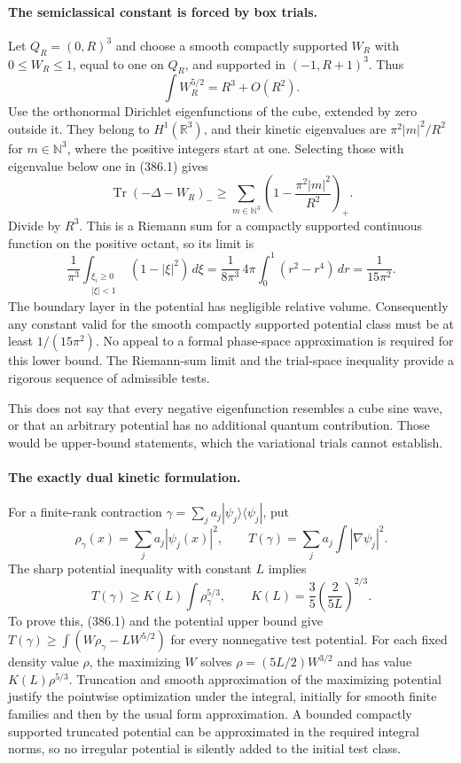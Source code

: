 \documentclass[11pt]{article}
\begin{document}
\paragraph{The semiclassical constant is forced by box trials.}
Let $Q_R=(0,R)^3$ and choose a smooth compactly supported $W_R$
with $0\leq W_R\leq1$, equal to one on $Q_R$, and supported in
$(-1,R+1)^3$. Thus
\[
 \int W_R^{5/2}=R^3+O(R^2).
\]
Use the orthonormal Dirichlet eigenfunctions of the cube, extended
by zero outside it. They belong to $H^1(\mathbb R^3)$, and their
kinetic eigenvalues are $\pi^2|m|^2/R^2$ for
$m\in\mathbb N^3$, where the positive integers start at one.
Selecting those with eigenvalue below one in (386.1) gives
\[
 \operatorname{Tr}(-\Delta-W_R)_-
 \geq\sum_{m\in\mathbb N^3}
       \left(1-\frac{\pi^2|m|^2}{R^2}\right)_+.
 \tag{386.2}
\]
Divide by $R^3$. This is a Riemann sum for a compactly supported
continuous function on the positive octant, so its limit is
\[
 \frac1{\pi^3}\int_{\substack{\xi_i\geq0\\|\xi|<1}}
                  (1-|\xi|^2)\,d\xi
 =\frac1{8\pi^3}\,4\pi\int_0^1(r^2-r^4)\,dr
 =\frac1{15\pi^2}.
 \tag{386.3}
\]
The boundary layer in the potential has negligible relative volume.
Consequently any constant valid for the smooth compactly supported
potential class must be at least $1/(15\pi^2)$. No appeal to a
formal phase-space approximation is required for this lower bound.
The Riemann-sum limit and the trial-space inequality provide a
rigorous sequence of admissible tests.

This does not say that every negative eigenfunction resembles a
cube sine wave, or that an arbitrary potential has no additional
quantum contribution. Those would be upper-bound statements, which
the variational trials cannot establish.

\paragraph{The exactly dual kinetic formulation.}
For a finite-rank contraction
$\gamma=\sum_j a_j|\psi_j\rangle\langle\psi_j|$, put
\[
 \rho_\gamma(x)=\sum_j a_j|\psi_j(x)|^2,\qquad
 T(\gamma)=\sum_j a_j\int|\nabla\psi_j|^2.
\]
The sharp potential inequality with constant $L$ implies
\[
 T(\gamma)\geq K(L)\int\rho_\gamma^{5/3},
 \qquad K(L)=\frac35\left(\frac2{5L}\right)^{2/3}.
 \tag{386.4}
\]
To prove this, (386.1) and the potential upper bound give
$T(\gamma)\geq\int(W\rho_\gamma-LW^{5/2})$ for every nonnegative
test potential. For each fixed density value $\rho$, the maximizing
$W$ solves $\rho=(5L/2)W^{3/2}$ and has value
$K(L)\rho^{5/3}$. Truncation and smooth approximation of the
maximizing potential justify the pointwise optimization under the
integral, initially for smooth finite families and then by the
usual form approximation. A bounded compactly supported truncated
potential can be approximated in the required integral norms, so
no irregular potential is silently added to the initial test class.
\end{document}
